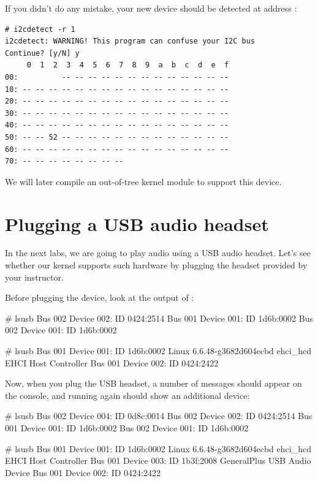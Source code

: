 If you didn't do any mistake, your new device should be detected at
address :

\begin{verbatim}
# i2cdetect -r 1
i2cdetect: WARNING! This program can confuse your I2C bus
Continue? [y/N] y
     0  1  2  3  4  5  6  7  8  9  a  b  c  d  e  f
00:          -- -- -- -- -- -- -- -- -- -- -- -- --
10: -- -- -- -- -- -- -- -- -- -- -- -- -- -- -- --
20: -- -- -- -- -- -- -- -- -- -- -- -- -- -- -- --
30: -- -- -- -- -- -- -- -- -- -- -- -- -- -- -- --
40: -- -- -- -- -- -- -- -- -- -- -- -- -- -- -- --
50: -- -- 52 -- -- -- -- -- -- -- -- -- -- -- -- --
60: -- -- -- -- -- -- -- -- -- -- -- -- -- -- -- --
70: -- -- -- -- -- -- -- --
\end{verbatim}

We will later compile an out-of-tree kernel module to support this device.

\section{Plugging a USB audio headset}

In the next labs, we are going to play audio using a USB audio headset.
Let's see whether our kernel supports such hardware by plugging the
headset provided by your instructor.

Before plugging the device, look at the output of :

\if{}
      \begin{bashinput}
      # lsusb
      Bus 002 Device 002: ID 0424:2514
      Bus 001 Device 001: ID 1d6b:0002
      Bus 002 Device 001: ID 1d6b:0002
      \end{bashinput}
\fi
\if{}
      \begin{bashinput}
      # lsusb 
      Bus 001 Device 001: ID 1d6b:0002 Linux 6.6.48-g3682d604ecbd ehci_hcd EHCI Host Controller
      Bus 001 Device 002: ID 0424:2422 
      \end{bashinput}
\fi
Now, when you plug the USB headset, a number of messages should appear
on the console, and running  again should show an
additional device:

\if{}
      \begin{bashinput}
      # lsusb
      Bus 002 Device 004: ID 0d8c:0014
      Bus 002 Device 002: ID 0424:2514
      Bus 001 Device 001: ID 1d6b:0002
      Bus 002 Device 001: ID 1d6b:0002
      \end{bashinput}
\fi
\if{}
      \begin{bashinput}
      # lsusb 
      Bus 001 Device 001: ID 1d6b:0002 Linux 6.6.48-g3682d604ecbd ehci_hcd EHCI Host Controller
      Bus 001 Device 003: ID 1b3f:2008 GeneralPlus USB Audio Device
      Bus 001 Device 002: ID 0424:2422 
      \end{bashinput}
\fi

